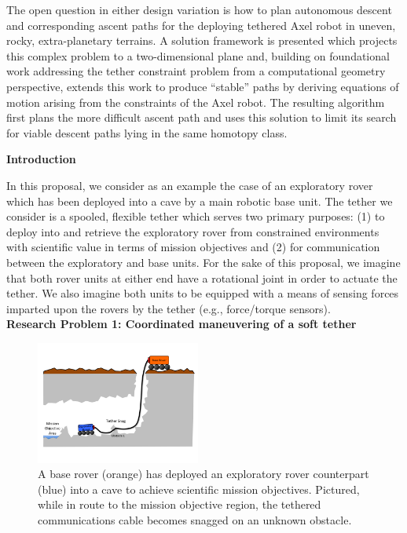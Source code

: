 \documentclass[12pt]{article}
\begin{document}
The open question in either design variation is how to plan autonomous descent and corresponding 
ascent paths for the deploying tethered Axel robot in uneven, rocky, extra-planetary terrains. 
A solution framework is presented which projects this complex problem to a two-dimensional plane and, 
building on foundational work addressing the tether constraint problem from a computational geometry 
perspective, extends this work to produce ``stable'' paths by deriving equations of motion arising from 
the constraints of the Axel robot. The resulting algorithm first plans the more difficult ascent path and
uses this solution to limit its search for viable descent paths lying in the same homotopy class. 






{\bf Introduction \\}

\vspace{-0.15in}In this proposal, we consider as an example the case of an exploratory rover which has been deployed into a cave by a main robotic base unit. The tether we consider is a spooled, flexible tether which serves two primary purposes: (1) to deploy into and retrieve the exploratory rover from constrained environments with scientific value in terms of mission objectives and (2) for communication between the exploratory and base units. For the sake of this proposal, we imagine that both rover units at either end have a rotational joint in order to actuate the tether. We also imagine both units to be equipped with a means of sensing forces imparted upon the rovers by the tether (e.g., force/torque sensors). \\

{\bf Research Problem 1: Coordinated maneuvering of a soft tether \\}
\begin{figure}
  \begin{center}
    \vspace{-0.5in}
    \includegraphics[width=0.48\textwidth, right]{cave_exploration}
  \end{center}
  \vspace{-0.5in}
  \label{fig:cave}
  \caption{A base rover (orange) has deployed an exploratory rover counterpart (blue) into a cave to achieve scientific mission objectives. Pictured, while in route to the mission objective region, the tethered communications cable becomes snagged on an unknown obstacle.}
\end{figure}
\vspace{-0.15in}
\end{document}
